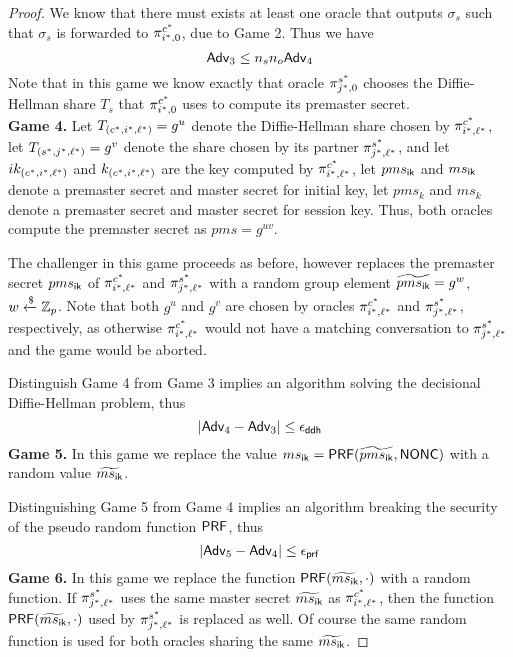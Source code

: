 \begin{proof}
 We know that there must exists at least one oracle that outputs $\sigma_s$ such that $\sigma_s$ is forwarded to $\pi^{c^{\ast}}_{i^{\ast},0}$, due to Game 2. Thus we have
 \begin{equation}
  \mathsf{Adv}_3 \leq n_s n_o \mathsf{Adv}_4
 \end{equation}%
 Note that in this game we know exactly that oracle $\pi^{s^{\ast}}_{j^{\ast},0}$ chooses the Diffie-Hellman share $T_s$ that $\pi^{c^{\ast}}_{i^{\ast},0}$ uses to compute its premaster secret.
 \vspace{10pt}\\
%
%
 \textbf{Game 4.} Let $T_{(c^{\ast}, {i^{\ast}, \ell^{\ast})}} = g^u$ denote the Diffie-Hellman share chosen by $\pi^{c^{\ast}}_{i^{\ast},\ell^{\ast}}$, let $T_{(s^{\ast}, {j^{\ast}, \ell^{\ast})}} = g^v$ denote the share chosen by its partner $\pi^{s^{\ast}}_{j^{\ast},\ell^{\ast}}$, and let $ik_{(c^{\ast}, {i^{\ast}, \ell^{\ast})}}$ and $k_{(c^{\ast}, {i^{\ast}, \ell^{\ast})}}$ are the key computed by $\pi^{c^{\ast}}_{i^{\ast},\ell^{\ast}}$, let $pms_{\mathsf{ik}}$ and $ms_{\mathsf{ik}}$ denote a premaster secret and master secret for initial key, let $pms_{k}$ and $ms_{k}$ denote a premaster secret and master secret for session key. Thus, both oracles compute the premaster secret as $pms = g^{uv}$.

 The challenger in this game proceeds as before, however replaces the premaster secret $pms_{\mathsf{ik}}$ of $\pi^{c^{\ast}}_{i^{\ast},\ell^{\ast}}$ and $\pi^{s^{\ast}}_{j^{\ast},\ell^{\ast}}$ with a random group element $\widetilde{pms_{\mathsf{ik}}} = g^w$, $w \xleftarrow{\$} \mathbb{Z}_p$. Note that both $g^u$ and $g^v$ are chosen by oracles $\pi^{c^{\ast}}_{i^{\ast},\ell^{\ast}}$ and $\pi^{s^{\ast}}_{j^{\ast},\ell^{\ast}}$, respectively, as otherwise $\pi^{c^{\ast}}_{i^{\ast},\ell^{\ast}}$ would not have a matching conversation to $\pi^{s^{\ast}}_{j^{\ast},\ell^{\ast}}$ and the game would be aborted.

 Distinguish Game 4 from Game 3 implies an algorithm solving the decisional Diffie-Hellman problem, thus
 \begin{equation}
  |\mathsf{Adv}_{4} - \mathsf{Adv}_{3}| \leq \epsilon_{\mathsf{ddh}}
 \end{equation}%
%
%
 \textbf{Game 5.} In this game we replace the value $ms_{\mathsf{ik}} = \mathsf{PRF}(\widetilde{pms_{\mathsf{ik}}}, \mathsf{NONC})$ with a random value $\widetilde{ms_{\mathsf{ik}}}$.

 Distinguishing Game 5 from Game 4 implies an algorithm breaking the security of the pseudo random function $\mathsf{PRF}$, thus
 \begin{equation}
  |\mathsf{Adv}_{5} - \mathsf{Adv}_{4}| \leq \epsilon_{\mathsf{prf}}
 \end{equation}%
%
%
 \textbf{Game 6.} In this game we replace the function $\mathsf{PRF}(\widetilde{ms_{\mathsf{ik}}},\cdot)$ with a random function. If $\pi^{s^{\ast}}_{j^{\ast},\ell^{\ast}}$ uses the same master secret $\widetilde{ms_{\mathsf{ik}}}$ as $\pi^{c^{\ast}}_{i^{\ast},\ell^{\ast}}$, then the function $\mathsf{PRF}(\widetilde{ms_{\mathsf{ik}}},\cdot)$ used by $\pi^{s^{\ast}}_{j^{\ast},\ell^{\ast}}$ is replaced as well. Of course the same random function is used for both oracles sharing the same $\widetilde{ms_{\mathsf{ik}}}$.


\end{proof}
